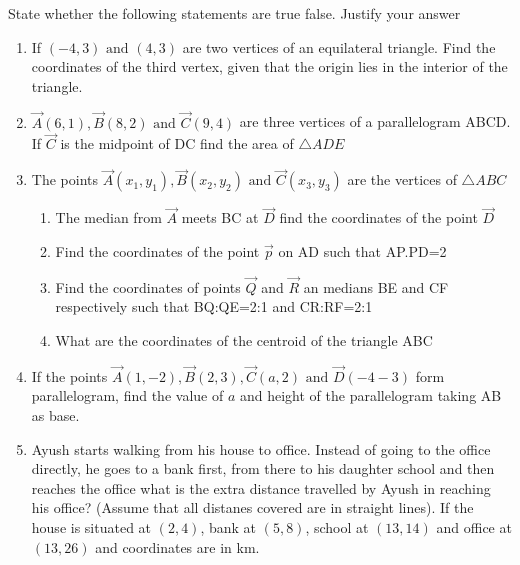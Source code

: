 State whether the following statements are true false. Justify your answer
\begin{enumerate}[label=\thesection.\arabic*,ref=\thesection.\theenumi]
\item If $(-4,3)\text{ and }(4,3)$ are two vertices of an equilateral triangle. Find the coordinates of the third vertex, given that the origin lies in the interior of the triangle. 
\item $\vec{A} (6,1),\vec{B}(8,2) \text{ and } \vec{C}(9,4)$ are three vertices of a parallelogram ABCD. If $\vec{C}$ is the midpoint of DC find the area of $\triangle ADE$
\item The points $\vec{A} (x_1,y_1),\vec{B}(x_2,y_2)\text{ and } \vec{C} (x_3,y_3) $ are the vertices of $\triangle ABC$
	\begin{enumerate}	
		\item The median from $\vec{A}$ meets BC at $\vec{D}$ find the coordinates of the point $\vec{D}$
		\item Find the coordinates of the point $\vec{p}$ on AD such that AP.PD=2
\item Find the coordinates of points $\vec{Q}$ and $\vec{R}$ an medians BE and CF respectively such that BQ:QE=2:1 and CR:RF=2:1
\item What are the coordinates of the centroid of the triangle ABC
	\end{enumerate}
\item If the points  $\vec{A}(1,-2), \vec{B}(2,3) , \vec{C}(a,2)\text{ and }\vec{D} (-4-3)$ form parallelogram, find the value of $a$ and height of the parallelogram taking AB as base.
\item Ayush starts walking from his house to office. Instead of going to the office directly, he goes to a bank first, from there to his daughter school and then reaches the office what is the extra distance travelled by Ayush in reaching his office? (Assume that all distanes covered are in straight lines). If the house is situated at $(2,4)$, bank at $(5,8)$, school at $(13,14)$ and office at $(13,26)$ and coordinates are in km.

	\end{enumerate}


